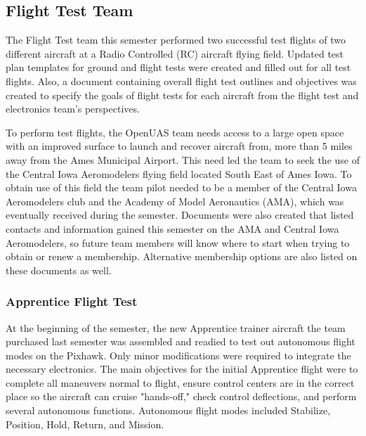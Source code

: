 \documentclass{article}
\begin{document}
\subsection{Flight Test Team}
The Flight Test team this semester performed two successful test flights of two different aircraft at a Radio Controlled (RC) aircraft flying field. Updated test plan templates for ground and flight tests were created and filled out for all test flights. Also, a document containing overall flight test outlines and objectives was created to specify the goals of flight tests for each aircraft from the flight test and electronics team's perspectives.

To perform test flights, the OpenUAS team needs access to a large open space with an improved surface to launch and recover aircraft from, more than 5 miles away from the Ames Municipal Airport. This need led the team to seek the use of the Central Iowa Aeromodelers flying field located South East of Ames Iowa. To obtain use of this field the team pilot needed to be a member of the Central Iowa Aeromodelers club and the Academy of Model Aeronautics (AMA), which was eventually received during the semester. Documents were also created that listed contacts and information gained this semester on the AMA and Central Iowa Aeromodelers, so future team members will know where to start when trying to obtain or renew a membership. Alternative membership options are also listed on these documents as well.


\subsubsection{Apprentice Flight Test}\label{apprenticeflight}
At the beginning of the semester, the new Apprentice trainer aircraft the team purchased last semester was assembled and readied to test out autonomous flight modes on the Pixhawk. Only minor modifications were required to integrate the necessary electronics. The main objectives for the initial Apprentice flight were to complete all maneuvers normal to flight, ensure control centers are in the correct place so the aircraft can cruise "hands-off," check control deflections, and perform several autonomous functions. Autonomous flight modes included Stabilize, Position, Hold, Return, and Mission.
\end{document}
